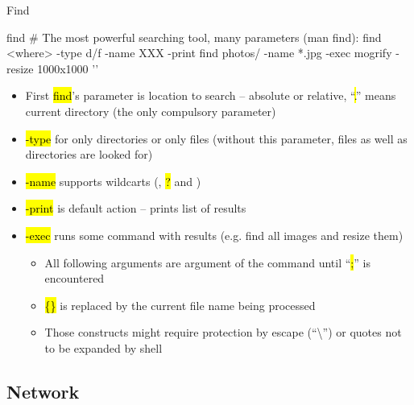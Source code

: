 \documentclass[compress, ucs, xelatex, 11pt, xcolor=svgnames,
  hyperref={
    bookmarks=true,
    unicode=true,
    colorlinks=true,
    pdftitle={Linux, command line and MetaCentrum},
    plainpages=false,
    pdfauthor={Vojtech Zeisek},
    pdfsubject={Course about use of Linux command line, writing shell scripts and using MetaCentrum of CESNET},
    pdfcreator={XeLaTeX},
    pdfkeywords={Linux, GNU, BASH, shell, command line, MetaCentrum},
    linkcolor=DarkRed,
    anchorcolor=DarkBlue,
    citecolor=Indigo,
    filecolor=NavyBlue,
    menucolor=DarkMagenta,
    urlcolor=DarkBlue,
    pdftex},
  url={hyphens, lowtilde} %
  ]{beamer}
\renewcommand{\texttt}[1]{\hl{\ttfamily #1}}
\begin{document}
\begin{frame}[fragile]{Find}
  \begin{bashcode}
    find # The most powerful searching tool, many parameters (man find):
    find <where> -type d/f -name XXX -print
    find photos/ -name *.jpg -exec mogrify -resize 1000x1000 '{}' \;
  \end{bashcode}
  \begin{itemize}
    \item First \texttt{find}'s parameter is location to search -- absolute or relative, ``\texttt{.}'' means current directory (the only compulsory parameter)
    \item \texttt{-type} for only directories or only files (without this parameter, files as well as directories are looked for)
    \item \texttt{-name} supports wildcarts (\texttt{*}, \texttt{?} and \texttt{[\ldots]})
    \item \texttt{-print} is default action -- prints list of results
    \item \texttt{-exec} runs some command with results (e.g. find all images and resize them)
    \begin{itemize}
      \item All following arguments are argument of the command until ``\texttt{;}'' is encountered
      \item \texttt{\{\}} is replaced by the current file name being processed
      \item Those constructs might require protection by escape (``\textbackslash'') or quotes not to be expanded by shell
    \end{itemize}
  \end{itemize}
\end{frame}

\subsection{Network}
\end{document}
